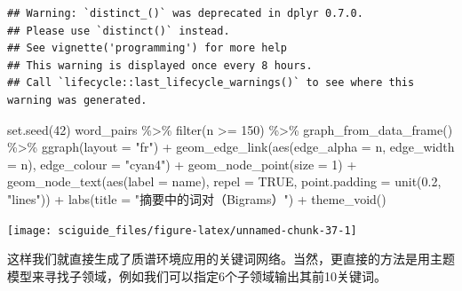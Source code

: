 \documentclass[]{tufte-book}
\newenvironment{Shaded}{}{}
\newcommand{\AttributeTok}[1]{\textcolor[rgb]{0.49,0.56,0.16}{#1}}
\newcommand{\ConstantTok}[1]{\textcolor[rgb]{0.53,0.00,0.00}{#1}}
\newcommand{\DecValTok}[1]{\textcolor[rgb]{0.25,0.63,0.44}{#1}}
\newcommand{\FloatTok}[1]{\textcolor[rgb]{0.25,0.63,0.44}{#1}}
\newcommand{\FunctionTok}[1]{\textcolor[rgb]{0.02,0.16,0.49}{#1}}
\newcommand{\NormalTok}[1]{#1}
\newcommand{\SpecialCharTok}[1]{\textcolor[rgb]{0.25,0.44,0.63}{#1}}
\newcommand{\StringTok}[1]{\textcolor[rgb]{0.25,0.44,0.63}{#1}}
\begin{document}
\begin{verbatim}
## Warning: `distinct_()` was deprecated in dplyr 0.7.0.
## Please use `distinct()` instead.
## See vignette('programming') for more help
## This warning is displayed once every 8 hours.
## Call `lifecycle::last_lifecycle_warnings()` to see where this warning was generated.
\end{verbatim}

\begin{Shaded}
\begin{Highlighting}[]
\FunctionTok{set.seed}\NormalTok{(}\DecValTok{42}\NormalTok{)}
\NormalTok{word\_pairs }\SpecialCharTok{\%\textgreater{}\%}
  \FunctionTok{filter}\NormalTok{(n }\SpecialCharTok{\textgreater{}=} \DecValTok{150}\NormalTok{) }\SpecialCharTok{\%\textgreater{}\%}
  \FunctionTok{graph\_from\_data\_frame}\NormalTok{() }\SpecialCharTok{\%\textgreater{}\%}
  \FunctionTok{ggraph}\NormalTok{(}\AttributeTok{layout =} \StringTok{"fr"}\NormalTok{) }\SpecialCharTok{+}
  \FunctionTok{geom\_edge\_link}\NormalTok{(}\FunctionTok{aes}\NormalTok{(}\AttributeTok{edge\_alpha =}\NormalTok{ n, }\AttributeTok{edge\_width =}\NormalTok{ n), }\AttributeTok{edge\_colour =} \StringTok{"cyan4"}\NormalTok{) }\SpecialCharTok{+}
  \FunctionTok{geom\_node\_point}\NormalTok{(}\AttributeTok{size =} \DecValTok{1}\NormalTok{) }\SpecialCharTok{+}
  \FunctionTok{geom\_node\_text}\NormalTok{(}\FunctionTok{aes}\NormalTok{(}\AttributeTok{label =}\NormalTok{ name), }\AttributeTok{repel =} \ConstantTok{TRUE}\NormalTok{, }
                 \AttributeTok{point.padding =} \FunctionTok{unit}\NormalTok{(}\FloatTok{0.2}\NormalTok{, }\StringTok{"lines"}\NormalTok{)) }\SpecialCharTok{+}
  \FunctionTok{labs}\NormalTok{(}\AttributeTok{title =} \StringTok{"摘要中的词对（Bigrams）"}\NormalTok{) }\SpecialCharTok{+}
  \FunctionTok{theme\_void}\NormalTok{()}
\end{Highlighting}
\end{Shaded}

\texttt{[image: sciguide\_files/figure-latex/unnamed-chunk-37-1]}

这样我们就直接生成了质谱环境应用的关键词网络。当然，更直接的方法是用主题模型来寻找子领域，例如我们可以指定6个子领域输出其前10关键词。
\end{document}
